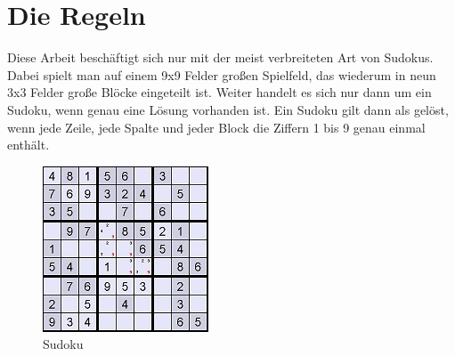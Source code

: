 \section{Die Regeln}
Diese Arbeit beschäftigt sich nur mit der meist verbreiteten Art von Sudokus. Dabei spielt man auf einem 9x9 Felder großen Spielfeld, das wiederum in neun 3x3 Felder große Blöcke eingeteilt ist. Weiter handelt es sich nur dann um ein Sudoku, wenn genau eine Lösung vorhanden ist.
Ein Sudoku gilt dann als gelöst, wenn jede Zeile, jede Spalte und jeder Block die Ziffern 1 bis 9 genau einmal enthält.\\
\begin{figure}[h]
\begin{center}
\includegraphics{./img/sudoku.jpg}
\caption{Sudoku}
\end{center}
\end{figure}